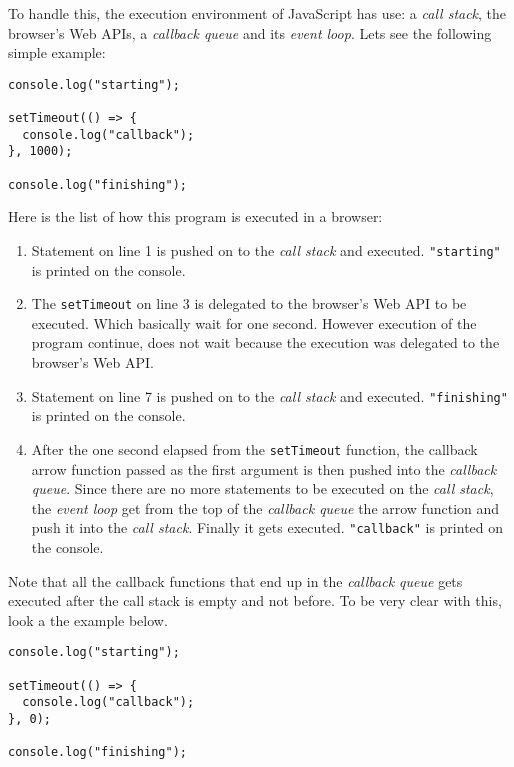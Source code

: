 \documentclass[a4paper, oneside, titlepage, 12pt]{book}
\begin{document}
To handle this, the execution environment of JavaScript has use: a \textit{call stack}, the browser's Web APIs, a \textit{callback queue} and its \textit{event loop}. Lets see the following simple example:

\begin{verbatim}
console.log("starting");

setTimeout(() => {
  console.log("callback");
}, 1000);

console.log("finishing");
\end{verbatim}

Here is the list of how this program is executed in a browser:
\begin{enumerate}
\item Statement on line 1 is pushed on to the \textit{call stack} and executed. \texttt{"starting"} is printed on the console. 
\item The \texttt{setTimeout} on line 3 is delegated to the browser's Web API to be executed. Which basically wait for one second. However execution of the program continue, does not wait because the execution was delegated to the browser's Web API.
\item Statement on line 7 is pushed on to the \textit{call stack} and executed. \texttt{"finishing"} is printed on the console.
\item After the one second elapsed from the \texttt{setTimeout} function, the callback arrow function passed as the first argument is then pushed into the \textit{callback queue}. Since there are no more statements to be executed on the \textit{call stack}, the \textit{event loop} get from the top of the \textit{callback queue} the arrow function and push it into the \textit{call stack}. Finally it gets executed. \texttt{"callback"} is printed on the console.
\end{enumerate}

Note that all the callback functions that end up in the \textit{callback queue} gets executed after the call stack is empty and not before. To be very clear with this, look a the example below.

\begin{verbatim}
console.log("starting");

setTimeout(() => {
  console.log("callback");
}, 0);

console.log("finishing");
\end{verbatim}
\end{document}
